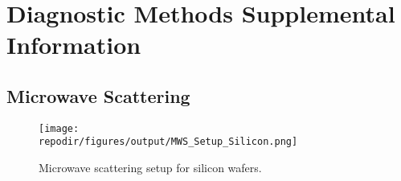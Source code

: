 \section{Diagnostic Methods Supplemental Information}

\subsection{Microwave Scattering}

\begin{figure}[]
\centering
\texttt{[image: \\repodir/figures/output/MWS\_Setup\_Silicon.png]}
\caption{Microwave scattering setup for silicon wafers.}
\end{figure}
